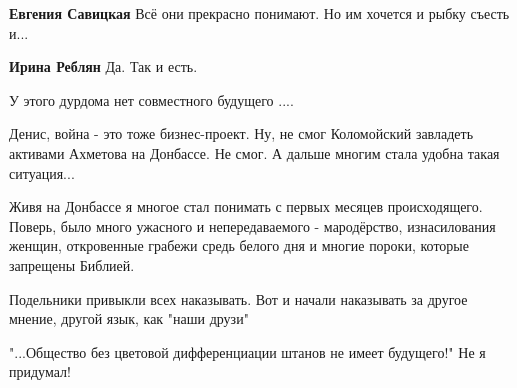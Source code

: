 \begin{itemize}
\begin{itemize}
\textbf{Евгения Савицкая}
Всё они прекрасно понимают. Но им хочется и рыбку съесть и...

 
\textbf{Ирина Реблян}
Да. Так и есть.
\end{itemize}

 
У этого дурдома нет совместного будущего ....

 

Денис, война - это тоже бизнес-проект. Ну, не смог Коломойский завладеть
активами Ахметова на Донбассе. Не смог. А дальше многим стала удобна такая
ситуация...

Живя на Донбассе я многое стал понимать с первых месяцев происходящего. Поверь,
было много ужасного и непередаваемого - мародёрство, изнасилования женщин,
откровенные грабежи средь белого дня и многие пороки, которые запрещены
Библией.


 
Подельники привыкли всех наказывать. Вот и начали наказывать за другое мнение,
другой язык, как "наши друзи"

 
"...Общество без цветовой дифференциации штанов не имеет будущего!" Не я придумал!


\end{itemize}
